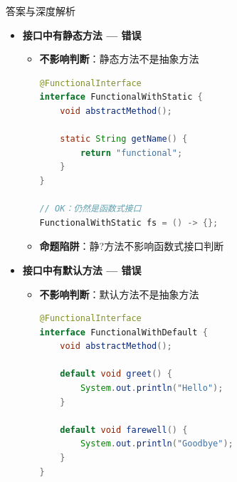 \documentclass[12pt, a4paper]{ctexart}
\begin{document}
\begin{enumerate}[label=\textbf{\arabic*.}]
\begin{bluebox}{答案与深度解析}
\begin{itemize}[leftmargin=*, nosep, label={}]
\begin{itemize}[label={}, leftmargin=*, nosep]
\begin{lstlisting}[language=Java]
// 错误：多个抽象方法
@FunctionalInterface  // 编译错误
interface Invalid {
    void method1();
    void method2();
}
				      \end{lstlisting}
				            \item \textbf{重要说明}：
				                  \begin{itemize}[label={}, nosep]
					                  \item 可以有多个默认方法
					                  \item 可以有多个静态方法
					                  \item 可以继承Object的方法
					                  \item 但只能有一个自己的抽象方法
				                  \end{itemize}
			            \end{itemize}

			      \item[C] \textbf{接口中有静态方法 — 错误}
			            \begin{itemize}[label={}, leftmargin=*, nosep]
				            \item \textbf{不影响判断}：静态方法不是抽象方法
				                  \begin{lstlisting}[language=Java]
@FunctionalInterface
interface FunctionalWithStatic {
    void abstractMethod();

    static String getName() {
        return "functional";
    }
}

// OK：仍然是函数式接口
FunctionalWithStatic fs = () -> {};
				      \end{lstlisting}
				            \item \textbf{命题陷阱}：静?方法不影响函数式接口判断
			            \end{itemize}

			      \item[D] \textbf{接口中有默认方法 — 错误}
			            \begin{itemize}[label={}, leftmargin=*, nosep]
				            \item \textbf{不影响判断}：默认方法不是抽象方法
				                  \begin{lstlisting}[language=Java]
@FunctionalInterface
interface FunctionalWithDefault {
    void abstractMethod();

    default void greet() {
        System.out.println("Hello");
    }

    default void farewell() {
        System.out.println("Goodbye");
    }
}


\end{lstlisting}
\end{itemize}
\end{itemize}
\end{bluebox}
\end{enumerate}
\end{document}
